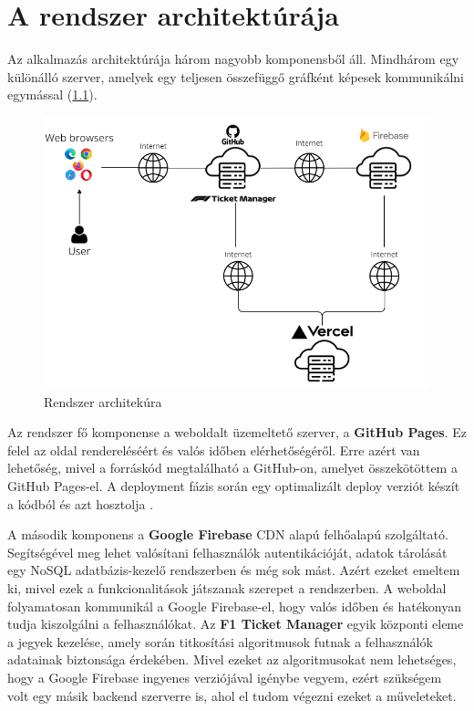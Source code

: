 \chapter{A rendszer architektúrája}

Az alkalmazás architektúrája három nagyobb komponensből áll. Mindhárom egy különálló szerver, amelyek egy teljesen összefüggő gráfként képesek kommunikálni egymással (\ref{abra:architecture}).

\begin{figure}[!h]
	\centering
	\includegraphics[scale=0.7]{images/architecture}
	\caption{Rendszer architekúra}
	\label{abra:architecture}
\end{figure}

Az rendszer fő komponense a weboldalt üzemeltető szerver, a \textbf{GitHub Pages}. Ez felel az oldal rendereléséért és valós időben elérhetőségéről. Erre azért van lehetőség, mivel a forráskód megtalálható a GitHub-on, amelyet összekötöttem a GitHub Pages-el. A deployment fázis során egy optimalizált deploy verziót készít a kódból és azt hosztolja \cite{Deploy}.

A második komponens a \textbf{Google Firebase} CDN alapú felhőalapú szolgáltató. Segítségével meg lehet valósítani felhasználók autentikációját, adatok tárolását egy NoSQL adatbázis-kezelő rendszerben és még sok mást. Azért ezeket emeltem ki, mivel ezek a funkcionalitások játszanak szerepet a rendszerben. A weboldal folyamatosan kommunikál a Google Firebase-el, hogy valós időben és hatékonyan tudja kiszolgálni a felhasználókat. Az \textbf{F1 Ticket Manager} egyik központi eleme a jegyek kezelése, amely során titkosítási algoritmusok futnak a felhasználók adatainak biztonsága érdekében. Mivel ezeket az algoritmusokat nem lehetséges, hogy a Google Firebase ingyenes verziójával igénybe vegyem, ezért szükségem volt egy másik backend szerverre is, ahol el tudom végezni ezeket a műveleteket.

